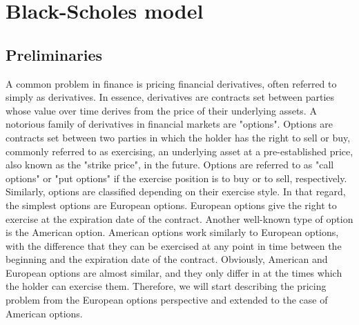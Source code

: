 \section{Black-Scholes model} \label{sec:blackscholes}

\subsection{Preliminaries}

A common problem in finance is pricing financial derivatives, often referred to simply as derivatives. In essence, derivatives are contracts set between parties whose value over time derives from the price of their underlying assets. A notorious family of derivatives in financial markets are "options". Options are contracts set between two parties in which the holder has the right to sell or buy, commonly referred to as exercising, an underlying asset at a pre-established price, also known as the "strike price", in the future. Options are referred to as "call options" or "put options" if the exercise position is to buy or to sell, respectively. Similarly, options are classified depending on their exercise style. In that regard, the simplest options are European options. European options give the right to exercise at the expiration date of the contract. Another well-known type of option is the American option. American options work similarly to European options, with the difference that they can be exercised at any point in time between the beginning and the expiration date of the contract. Obviously, American and European options are almost similar, and they only differ in at the times which the holder can exercise them. Therefore, we will start describing the pricing problem from the European options perspective and extended to the case of American options.

